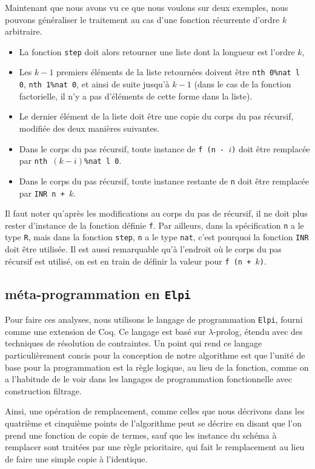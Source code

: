 \documentclass[draft]{jflart}
\begin{document}
Maintenant que nous avons vu ce que nous voulons sur deux exemples,
nous pouvons généraliser le traitement au cas d'une fonction
récurrente d'ordre \(k\) arbitraire.
\begin{itemize}
\item La fonction \texttt{step} doit
alors retourner une liste dont la longueur est l'ordre \(k\),
\item Les \(k-1\) premiers éléments de la liste retournées doivent
  être \texttt{nth 0\%nat l 0}, \texttt{nth 1\%nat 0}, et ainsi de suite
jusqu'à \(k - 1\)
  (dans le cas de la fonction factorielle, il n'y a pas d'éléments de
  cette forme dans la liste).
\item Le dernier élément de la liste doit être une copie du corps du
  pas récursif, modifiée des deux manières suivantes.
\item Dans le corps du pas récursif, toute instance de \texttt{f (n -
  \(i\))} doit être remplacée par \texttt{nth \((k - i)\)\%nat l 0}.
\item Dans le corps du pas récursif, toute instance restante de \texttt{n} doit
  être remplacée par \texttt{INR n + \(k\)}.
\end{itemize}
Il faut noter qu'après les modifications au corps du pas de récursif,
il ne doit plus rester d'instance de la fonction définie \texttt{f}.  Par
ailleurs, dans la spécification \texttt{n} a le type \texttt{R}, mais dans
la fonction \texttt{step}, \texttt{n} a le type \texttt{nat}, c'est pourquoi la
fonction \texttt{INR} doit être utilisée.  Il est aussi remarquable qu'à
l'endroit où le corps du pas récursif est utilisé, on est en train de
définir la valeur pour \texttt{f (n + \(k\))}.

\subsection{méta-programmation en \texttt{Elpi}}
Pour faire ces analyses, nous utilisons le langage de programmation
\texttt{Elpi}, fourni comme une extension de Coq.  Ce langage est basé
sur \(\lambda\)-prolog, étendu avec des techniques de résolution de
contraintes.  Un point qui rend ce langage particulièrement concis
pour la conception de notre algorithme est que l'unité de base pour la
programmation est la règle logique, au lieu de la fonction, comme on a
l'habitude de le voir dans les langages de programmation fonctionnelle
avec construction filtrage.

Ainsi, une opération de remplacement, comme celles que nous décrivons
dans les quatrième et cinquième points de l'algorithme peut se décrire
en disant que l'on prend une fonction de copie de termes, sauf que les
instance du schéma à remplacer sont traitées par une règle prioritaire,
qui fait le remplacement au lieu de faire une simple copie à
l'identique.
\end{document}
